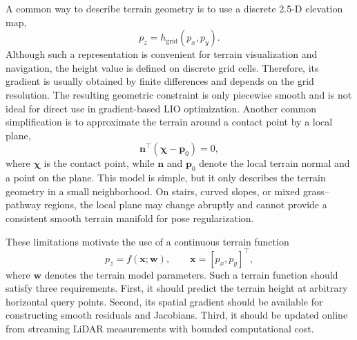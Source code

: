 \documentclass[journal,twoside,web]{ieeecolor}
\begin{document}
A common way to describe terrain geometry is to use a discrete 2.5-D elevation map,
\begin{equation}
    p_z = h_{\mathrm{grid}}(p_x,p_y).
\end{equation}
Although such a representation is convenient for terrain visualization and navigation, the height value is defined on discrete grid cells. Therefore, its gradient is usually obtained by finite differences and depends on the grid resolution. The resulting geometric constraint is only piecewise smooth and is not ideal for direct use in gradient-based LIO optimization. Another common simplification is to approximate the terrain around a contact point by a local plane,
\begin{equation}
    \mathbf{n}^{\top}\left(\bm{\chi}-\mathbf{p}_0\right)=0,
    \label{eq:problem_local_plane}
\end{equation}
where $\bm{\chi}$ is the contact point, while $\mathbf{n}$ and $\mathbf{p}_0$ denote the local terrain normal and a point on the plane. This model is simple, but it only describes the terrain geometry in a small neighborhood. On stairs, curved slopes, or mixed grass--pathway regions, the local plane may change abruptly and cannot provide a consistent smooth terrain manifold for pose regularization.

These limitations motivate the use of a continuous terrain function
\begin{equation}
    p_z = f(\mathbf{x};\mathbf{w}),
    \qquad
    \mathbf{x}=[p_x,p_y]^{\top},
    \label{eq:problem_terrain_function}
\end{equation}
where $\mathbf{w}$ denotes the terrain model parameters. Such a terrain function should satisfy three requirements. First, it should predict the terrain height at arbitrary horizontal query points. Second, its spatial gradient should be available for constructing smooth residuals and Jacobians. Third, it should be updated online from streaming LiDAR measurements with bounded computational cost.
\end{document}
